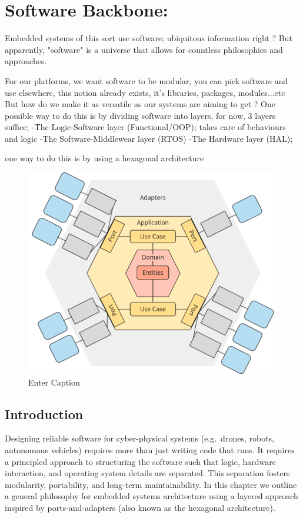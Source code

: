 \chapter{Software Backbone:}
Embedded systems of this sort use software; ubiquitous information right ? But apparently, "software" is a universe that allows for countless philosophies and approaches. 

For our platforms, we want software to be modular, you can pick software and use elsewhere, this notion already exists, it's libraries, packages, modules...etc But how do we make it as versatile as our systems are aiming to get ? One possible way to do this is by dividing software into layers, for now, 3 layers suffice; 
-The Logic-Software layer (Functional/OOP); takes care of behaviours and logic 
-The Software-Middlewear layer (RTOS)
-The Hardware layer (HAL);

one way to do this is by using a hexagonal architecture %

\begin{figure}
    \centering
    \includegraphics[width=0.5\linewidth]{image.png}
    \caption{Enter Caption}
    \label{fig:placeholder}
\end{figure}

\section{Introduction}

Designing reliable software for cyber-physical systems (e.g.\ drones, robots, autonomous vehicles) requires more than just writing code that runs. 
It requires a principled approach to structuring the software such that logic, hardware interaction, and operating system details are separated. 
This separation fosters modularity, portability, and long-term maintainability. 
In this chapter we outline a general philosophy for embedded systems architecture using a layered approach inspired by ports-and-adapters (also known as the hexagonal architecture).

